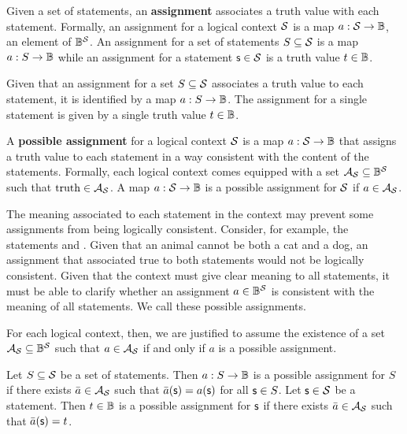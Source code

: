 \documentclass[11pt,letterpaper,fleqn]{memoir} %
\begin{document}
\begin{mathSection}
\begin{defn}
	Given a set of statements, an \textbf{assignment} associates a truth value with each statement. Formally, an assignment for a logical context $\mathcal{S}$ is a map $a : \mathcal{S} \to \mathbb{B}$, an element of $\mathbb{B}^{\mathcal{S}}$. An assignment for a set of statements $S \subseteq \mathcal{S}$ is a map $a : S \to \mathbb{B}$ while an assignment for a statement $\mathsf{s} \in \mathcal{S}$ is a truth value $t \in \mathbb{B}$.
\end{defn}

\begin{justification}
	Given that an assignment for a set $S \subseteq \mathcal{S}$ associates a truth value to each statement, it is identified by a map $a : S \to \mathbb{B}$. The assignment for a single statement is given by a single truth value $t \in \mathbb{B}$.
\end{justification}

\begin{axiom}\label{ax_possible_assignemetns}
	A \textbf{possible assignment} for a logical context $\mathcal{S}$ is a map $a : \mathcal{S} \to \mathbb{B}$ that assigns a truth value to each statement in a way consistent with the content of the statements. Formally, each logical context comes equipped with a set $\mathcal{A}_{\mathcal{S}} \subseteq \mathbb{B}^{\mathcal{S}}$ such that $\operatorname{truth} \in \mathcal{A}_{\mathcal{S}}$. A map $a : \mathcal{S} \to \mathbb{B}$ is a possible assignment for $\mathcal{S}$ if $a \in \mathcal{A}_{\mathcal{S}}$.
\end{axiom}

\begin{justification}
	The meaning associated to each statement in the context may prevent some assignments from being logically consistent. Consider, for example, the statements  and . Given that an animal cannot be both a cat and a dog, an assignment that associated true to both statements would not be logically consistent. Given that the context must give clear meaning to all statements, it must be able to clarify whether an assignment $a \in \mathbb{B}^{\mathcal{S}}$ is consistent with the meaning of all statements. We call these possible assignments.
	
	For each logical context, then, we are justified to assume the existence of a set $\mathcal{A}_{\mathcal{S}} \subseteq \mathbb{B}^{\mathcal{S}}$ such that $a \in \mathcal{A}_{\mathcal{S}}$ if and only if $a$ is a possible assignment.
\end{justification}

\begin{defn}
	Let $S \subseteq \mathcal{S}$ be a set of statements. Then $a : S \to \mathbb{B}$ is a possible assignment for $S$ if there exists $\bar{a} \in \mathcal{A}_{\mathcal{S}}$ such that $\bar{a}(\mathsf{s}) = a(\mathsf{s})$ for all $\mathsf{s} \in S$. Let $\mathsf{s} \in \mathcal{S}$ be a statement. Then $t \in \mathbb{B}$ is a possible assignment for $\mathsf{s}$ if there exists $\bar{a} \in \mathcal{A}_{\mathcal{S}}$ such that $\bar{a}(\mathsf{s}) = t$.
\end{defn}


\end{mathSection}
\end{document}
